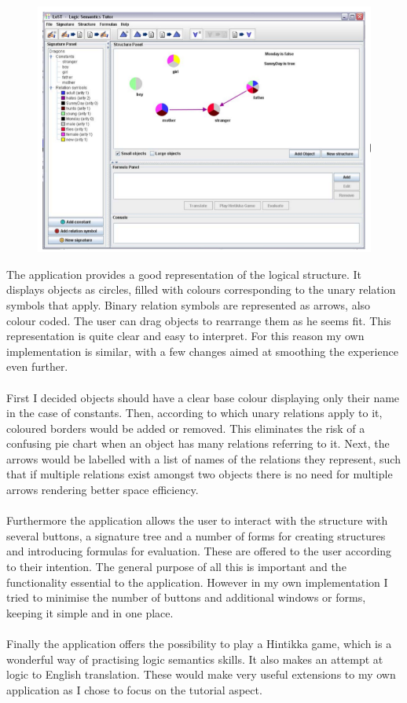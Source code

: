 \documentclass{report}
\begin{document}
\begin{figure}[h!]
\centering \includegraphics[scale=0.4]{oldlost.png}
\end{figure}

\noindent The application provides a good representation of the logical 
structure. It displays objects as circles, filled with colours corresponding to 
the unary relation symbols that apply. Binary relation symbols are represented 
as arrows, also colour coded. The user can drag objects to rearrange them as he 
seems fit. This representation is quite clear and easy to interpret. For this 
reason my own implementation is similar, with a few changes aimed at smoothing 
the experience even further. 
\\ \\
First I decided objects should have a clear base colour 
displaying only their name in the case of constants. Then, according to which 
unary relations apply to it, coloured borders would be added or removed. This 
eliminates the risk of a confusing pie chart when an object has many relations 
referring to it. Next, the arrows would be labelled with a list of names of the 
relations they represent, such that if multiple relations exist amongst two 
objects there is no need for multiple arrows rendering better space efficiency.
\\ \\
Furthermore the application allows the user to interact with the structure with 
several buttons, a signature tree and a number of forms for creating structures 
and introducing formulas for evaluation. These are offered to the user according 
to their intention. The general purpose of all this is important and the 
functionality essential to the application. However in my own implementation I 
tried to minimise the number of buttons and additional windows or forms, keeping 
it simple and in one place. 
\\ \\
Finally the application offers the possibility to play a Hintikka game, which is 
a wonderful way of practising logic semantics skills. It also makes an attempt 
at logic to English translation. These would make very useful extensions to my 
own application as I chose to focus on the tutorial aspect.
\end{document}
